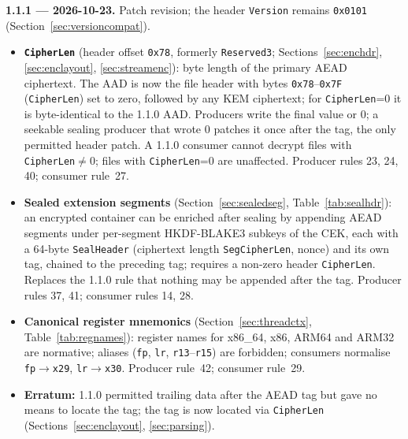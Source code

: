 \documentclass[11pt,a4paper]{article}
\newcommand{\hex}[1]{\texttt{0x#1}}
\newcommand{\field}[1]{\texttt{#1}}
\newcommand{\blake}{BLAKE3}
\begin{document}
\noindent\textbf{1.1.1 --- 2026-10-23.} Patch revision; the header \field{Version} remains \hex{0101} (Section~\ref{sec:versioncompat}).
\begin{itemize}[leftmargin=1.5em, itemsep=3pt]
\item \textbf{\field{CipherLen}} (header offset \hex{78}, formerly \field{Reserved3}; Sections~\ref{sec:enchdr}, \ref{sec:enclayout}, \ref{sec:streamenc}): byte length of the primary AEAD ciphertext. The AAD is now the file header with bytes \hex{78}--\hex{7F} (\field{CipherLen}) set to zero, followed by any KEM ciphertext; for \field{CipherLen}=0 it is byte-identical to the 1.1.0 AAD. Producers write the final value or 0; a seekable sealing producer that wrote 0 patches it once after the tag, the only permitted header patch. A 1.1.0 consumer cannot decrypt files with \field{CipherLen}$\neq$0; files with \field{CipherLen}=0 are unaffected. Producer rules 23, 24, 40; consumer rule~27.
\item \textbf{Sealed extension segments} (Section~\ref{sec:sealedseg}, Table~\ref{tab:sealhdr}): an encrypted container can be enriched after sealing by appending AEAD segments under per-segment HKDF-\blake{} subkeys of the CEK, each with a 64-byte \field{SealHeader} (ciphertext length \field{SegCipherLen}, nonce) and its own tag, chained to the preceding tag; requires a non-zero header \field{CipherLen}. Replaces the 1.1.0 rule that nothing may be appended after the tag. Producer rules 37, 41; consumer rules 14, 28.
\item \textbf{Canonical register mnemonics} (Section~\ref{sec:threadctx}, Table~\ref{tab:regnames}): register names for x86\_64, x86, ARM64 and ARM32 are normative; aliases (\texttt{fp}, \texttt{lr}, \texttt{r13}--\texttt{r15}) are forbidden; consumers normalise \texttt{fp}$\to$\texttt{x29}, \texttt{lr}$\to$\texttt{x30}. Producer rule~42; consumer rule~29.
\item \textbf{Erratum:} 1.1.0 permitted trailing data after the AEAD tag but gave no means to locate the tag; the tag is now located via \field{CipherLen} (Sections~\ref{sec:enclayout}, \ref{sec:parsing}).
\end{itemize}
\end{document}
